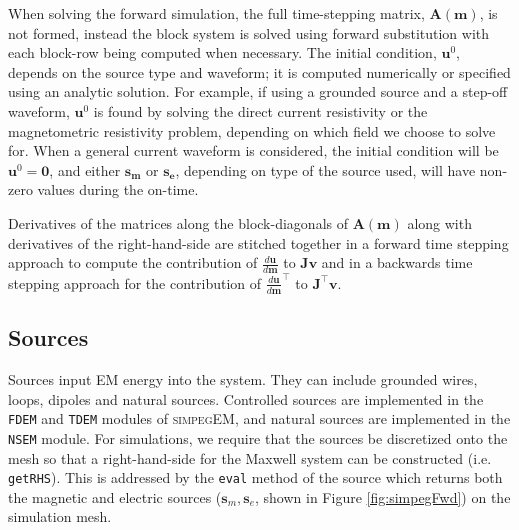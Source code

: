 \documentclass[preprint,review,3p,times,onecolumn,authoryear]{elsarticle}
\newcommand{\simpegEM}{\textsc{simpegEM}\xspace}
\newcommand{\TDEM}{\texttt{TDEM}\xspace}
\newcommand{\FDEM}{\texttt{FDEM}\xspace}
\newcommand{\NSEM}{\texttt{NSEM}\xspace}
\newcommand{\sm}{\mathbf{s}_m}
\newcommand{\se}{\mathbf{s}_e}
\begin{document}
When solving the forward simulation, the full time-stepping matrix,
$\mathbf{A}(\mathbf{m})$, is not formed, instead the block system is solved
using forward substitution with each block-row being computed when necessary.
The initial condition, $\mathbf{u}^{0}$, depends on the source type and
waveform; it is computed numerically or specified using an analytic
solution. For example, if using a grounded source and a step-off waveform,
$\mathbf{u}^{0}$ is found by solving the direct current resistivity or the
magnetometric resistivity problem, depending on which field we choose to solve for. When a general current waveform is
considered, the initial condition will be $\mathbf{u}^{0}=\mathbf{0}$, and either
$\mathbf{s_m}$ or $\mathbf{s_e}$, depending on type of the source used, will
have non-zero values during the on-time.

Derivatives of the matrices along the block-diagonals of
$\mathbf{A(m)}$ along with derivatives of the right-hand-side
are stitched together in a forward time stepping approach
to compute the contribution of $\frac{d\mathbf{u}}{d\mathbf{m}}$ to
$\mathbf{Jv}$ and in a backwards time stepping approach for the contribution
of $\frac{d\mathbf{u}}{d\mathbf{m}}^{\top}$ to $\mathbf{J}^{\top}\mathbf{v}$.


\subsection{Sources}
\label{sec:Sources}

Sources input EM energy into the system. They can include grounded wires,
loops, dipoles and natural sources. Controlled sources are implemented in the
\FDEM and \TDEM modules of \simpegEM, and natural sources are implemented in
the \NSEM module. For simulations, we require that the sources be discretized
onto the mesh so that a right-hand-side for the Maxwell system can be
constructed (i.e. \texttt{getRHS}). This is addressed by the \texttt{eval}
method of the source which returns both the magnetic and electric sources
($\sm, \se$, shown in Figure \ref{fig:simpegFwd}) on the simulation mesh.
\end{document}
